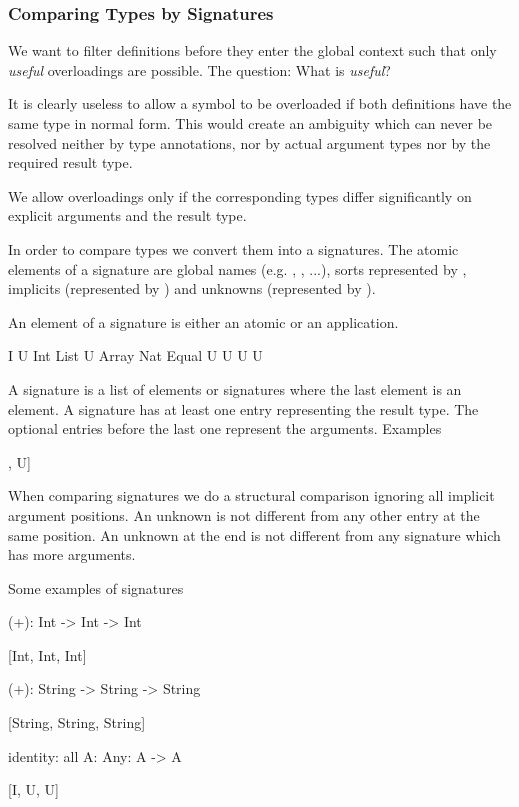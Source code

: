 \subsubsection{Comparing Types by Signatures}

We want to filter definitions before they enter the global context such that
only \emph{useful} overloadings are possible. The question: What is
\emph{useful}?

It is clearly useless to allow a symbol to be overloaded if both definitions
have the same type in normal form. This would create an ambiguity which can
never be resolved neither by type annotations, nor by actual argument types nor
by the required result type.

We allow overloadings only if the corresponding types differ significantly on
explicit arguments and the result type.

In order to compare types we convert them into a signatures. The atomic elements
of a signature are global names (e.g. , , ...), sorts
represented by , implicits
(represented by ) and unknowns (represented by ).

An element of a signature is either an atomic or an application.
\begin{alba}
    I
    U
    Int
    List U
    Array Nat
    Equal U U
    U U
\end{alba}

A signature is a list of elements or signatures where the last element is an
element. A signature has at least one entry representing the result type. The
optional entries before the last one represent the arguments. Examples
\begin{alba}
    [Int, Int, Int]
    [Float, Float, Float]
    [I, U, U, U]
    [I, U, List U, List U]
    [I, I, U, [U, U], U]
\end{alba}

When comparing signatures we do a structural comparison ignoring all implicit
argument positions. An unknown is not different from any other entry at the same
position. An unknown at the end is not different from any signature which has
more arguments.

Some examples of signatures
\begin{alba}
    (+): Int -> Int -> Int

        [Int, Int, Int]


    (+): String -> String -> String

        [String, String, String]


    identity: all {A: Any}: A -> A

        [I, U, U]
\end{alba}

